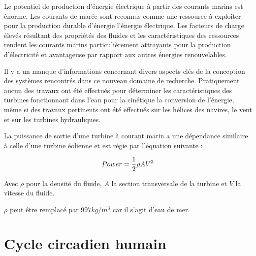 Le potentiel de production d'énergie électrique à partir des courants marins est énorme.
Les courants de marée sont reconnus comme une ressource à exploiter pour la production durable d'énergie l'énergie électrique.
Les facteurs de charge élevés résultant des propriétés des fluides et les caractéristiques des ressources rendent
les courants marins particulièrement attrayants pour la production d'électricité et avantageuse par rapport aux autres énergies renouvelables.

Il y a un manque d'informations concernant divers aspects clés de la conception des systèmes rencontrés dans ce nouveau domaine de recherche.
Pratiquement aucun des travaux ont été effectués pour déterminer les caractéristiques des turbines fonctionnant dans l'eau pour la cinétique la
conversion de l'énergie, même si des travaux pertinents ont été effectués sur les hélices des navires, le vent et sur les turbines hydrauliques.

La puissance de sortie d'une turbine à courant marin a une dépendance similaire à celle d'une turbine éolienne et est régie par l'équation suivante :

\begin{equation}
  Power = {1 \over 2} \rho A V^3
\end{equation}

Avec $\rho$ pour la densité du fluide, $A$ la section transversale de la turbine et $V$ la vitesse du fluide.

$\rho$ peut être remplacé par $997 kg/m^3$ car il s'agit d'eau de mer.

\section{Cycle circadien humain}



